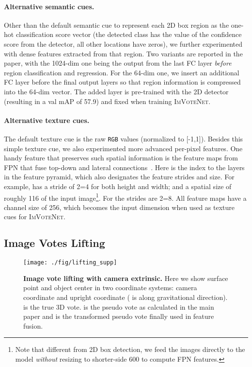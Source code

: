 \documentclass[10pt,twocolumn,letterpaper]{article}
\newcommand{\imvotenet}{\textsc{ImVoteNet}\xspace}
\newcommand{\ours}{\imvotenet}
\newcommand{\rgb}{\texttt{RGB}\xspace}
\begin{document}
\paragraph{Alternative semantic cues.} Other than the default semantic cue to represent each 2D box region as the one-hot classification score vector (the detected class has the value of the confidence score from the detector, all other locations have zeros), we further experimented with dense \roi features extracted from that region. Two variants are reported in the paper, with the 1024-dim one being the output from the last FC layer \emph{before} region classification and regression. For the 64-dim one, we insert an additional FC layer before the final output layers so that region information is compressed into the 64-dim vector. The added layer is pre-trained with the 2D detector (resulting in a val mAP of 57.9) and fixed when training \ours. 

\paragraph{Alternative texture cues.} The default texture cue is the raw \rgb values (normalized to [-1,1]). Besides this simple texture cue, we also experimented more advanced per-pixel features. One handy feature that preserves such spatial information is the feature maps  from FPN that fuse top-down and lateral connections~\cite{lin2017feature}. Here  is the index to the layers in the feature pyramid, which also designates the feature strides and size. For example,  has a stride of 2=4 for both height and width; and a spatial size of roughly 116 of the input image\footnote{Note that different from 2D box detection, we feed the images directly to the model \emph{without} resizing to shorter-side 600 to compute FPN features.}. For  the strides are 2=8. All feature maps have a channel size of 256, which becomes the input dimension when used as texture cues for \ours. 

\subsection{Image Votes Lifting}
\label{supp:sec:lift}

\begin{figure}[t!]
    \centering
    \texttt{[image: ./fig/lifting\_supp]}
    \caption{\textbf{Image vote lifting with camera extrinsic.} Here we show surface point  and object center  in two coordinate systems: camera coordinate and upright coordinate ( is along gravitational direction).  is the true 3D vote.  is the pseudo vote as calculated in the main paper and  is the transformed pseudo vote finally used in feature fusion.}
    \label{fig:lift_supp}
\end{figure}
\end{document}
